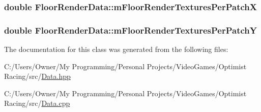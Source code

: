 \hypertarget{class_floor_render_data_a7135effa977d515b9d3b648531b0b730}{
\subsubsection[{m\-Floor\-Render\-Textures\-Per\-Patch\-X}]{\setlength{\rightskip}{0pt plus 5cm}double Floor\-Render\-Data\-::m\-Floor\-Render\-Textures\-Per\-Patch\-X}}\label{class_floor_render_data_a7135effa977d515b9d3b648531b0b730}
\hypertarget{class_floor_render_data_afc74644c8e0c98fadcb158a5e3cd7e10}{
\subsubsection[{m\-Floor\-Render\-Textures\-Per\-Patch\-Y}]{\setlength{\rightskip}{0pt plus 5cm}double Floor\-Render\-Data\-::m\-Floor\-Render\-Textures\-Per\-Patch\-Y}}\label{class_floor_render_data_afc74644c8e0c98fadcb158a5e3cd7e10}


The documentation for this class was generated from the following files\-:\begin{DoxyCompactItemize}
\item 
C\-:/\-Users/\-Owner/\-My Programming/\-Personal Projects/\-Video\-Games/\-Optimist Racing/src/\hyperlink{_data_8hpp}{Data.\-hpp}\item 
C\-:/\-Users/\-Owner/\-My Programming/\-Personal Projects/\-Video\-Games/\-Optimist Racing/src/\hyperlink{_data_8cpp}{Data.\-cpp}\end{DoxyCompactItemize}
